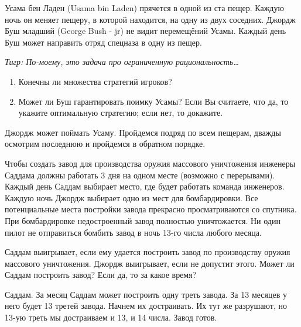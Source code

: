 \begin{problem}\par

Усама бен Ладен (Usama bin Laden) прячется в одной из ста пещер. Каждую ночь он меняет пещеру, в которой находится, на одну из двух соседних. Джордж Буш младший (George Bush - jr) не видит перемещёний Усамы. Каждый день Буш может направить отряд спецназа в одну из пещер. \par

{\it Тигр: По-моему, это задача про ограниченную рациональность\ldots }\par
\begin{enumerate}
\item 	Конечны ли множества стратегий игроков?\par
\item		Может ли Буш гарантировать поимку Усамы? Если Вы считаете, что да, то укажите оптимальную стратегию; если нет, то докажите.
\end{enumerate}


\begin{sol}
Джордж может поймать Усаму. Пройдемся подряд по всем пещерам, дважды осмотрим последнюю и пройдемся в обратном порядке.
\end{sol}
\end{problem}







\begin{problem}\par

Чтобы создать завод для производства оружия массового уничтожения инженеры Саддама должны работать 3 дня на одном месте (возможно с перерывами). Каждый день Саддам выбирает место, где будет работать команда инженеров. Каждую ночь Джордж выбирает одно из мест для бомбардировки. Все потенциальные места постройки завода прекрасно просматриваются со спутника. При бомбардировке недостроенный завод полностью уничтожается. Ни один пилот не отправиться бомбить завод в ночь 13-го числа любого месяца. %

Саддам выигрывает, если ему удается построить завод по производству оружия массового уничтожения. Джордж выигрывает, если не допустит этого. Может ли Саддам построить завод? Если да, то за какое время?



\begin{sol}
Саддам. За месяц Саддам может построить одну треть завода. За 13 месяцев у него будет 13 третей завода. Начнем их достраивать. Их тут же разрушают, но 13-ую треть мы достраиваем и 13, и 14 числа. Завод готов.
\end{sol}
\end{problem}





